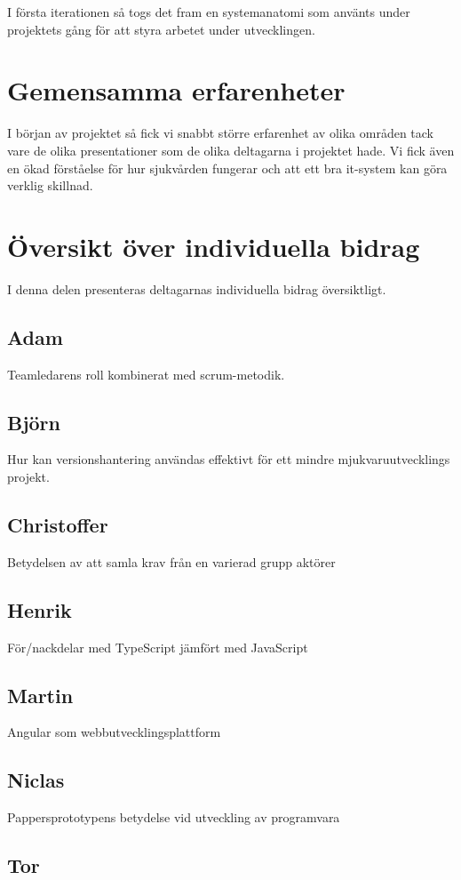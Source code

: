 I första iterationen så togs det fram en systemanatomi som använts under
projektets gång för att styra arbetet under utvecklingen.


\section{Gemensamma erfarenheter}
I början av projektet så fick vi snabbt större erfarenhet av olika områden
tack vare de olika presentationer som de olika deltagarna i projektet hade.
Vi fick även en ökad förståelse för hur sjukvården fungerar och att ett bra
it-system kan göra verklig skillnad.

\section{Översikt över individuella bidrag}
I denna delen presenteras deltagarnas individuella bidrag översiktligt.

\subsection{Adam}
Teamledarens roll kombinerat med scrum-metodik.
\subsection{Björn}
Hur kan versionshantering användas effektivt för ett mindre mjukvaruutvecklings projekt.
\subsection{Christoffer}
Betydelsen av att samla krav från en varierad grupp aktörer
\subsection{Henrik}
För/nackdelar med TypeScript jämfört med JavaScript
\subsection{Martin}
Angular som webbutvecklingsplattform
\subsection{Niclas}
Pappersprototypens betydelse vid utveckling av programvara
\subsection{Tor}
